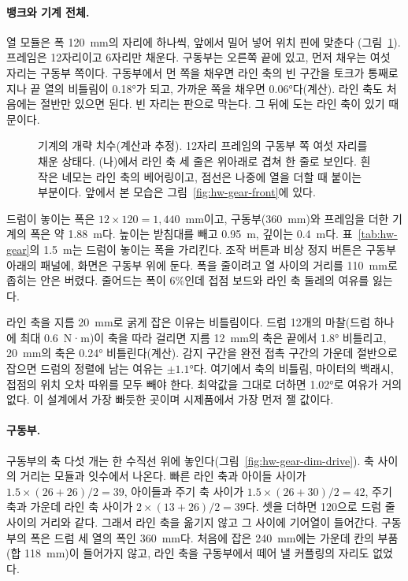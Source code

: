 \paragraph{뱅크와 기계 전체.} 열 모듈은 폭 120~mm의 자리에 하나씩, 앞에서 밀어 넣어 위치 핀에 맞춘다
(그림~\ref{fig:hw-gear-dim-bank}). 프레임은 12자리이고 6자리만 채운다. 구동부는 오른쪽 끝에 있고, 먼저 채우는
여섯 자리는 구동부 쪽이다. 구동부에서 먼 쪽을 채우면 라인 축의 빈 구간을 토크가 통째로 지나 끝 열의
비틀림이 0.18°가 되고, 가까운 쪽을 채우면 0.06°다(계산). 라인 축도 처음에는 절반만 있으면 된다. 빈 자리는
판으로 막는다. 그 뒤에 도는 라인 축이 있기 때문이다.

\begin{figure}[ht]
\centering

\caption{기계의 개략 치수(계산과 추정). 12자리 프레임의 구동부 쪽 여섯 자리를 채운 상태다. (나)에서 라인 축
세 줄은 위아래로 겹쳐 한 줄로 보인다. 흰 작은 네모는 라인 축의 베어링이고, 점선은 나중에 열을 더할 때
붙이는 부분이다. 앞에서 본 모습은 그림~\ref{fig:hw-gear-front}에 있다.}
\label{fig:hw-gear-dim-bank}
\end{figure}

드럼이 놓이는 폭은 $12 \times 120 = 1{,}440$~mm이고, 구동부(360~mm)와 프레임을 더한 기계의 폭은 약 1.88~m다.
높이는 받침대를 빼고 0.95~m, 깊이는 0.4~m다. 표~\ref{tab:hw-gear}의 1.5~m는 드럼이 놓이는 폭을 가리킨다.
조작 버튼과 비상 정지 버튼은 구동부 아래의 패널에, 화면은 구동부 위에 둔다. 폭을 줄이려고 열 사이의
거리를 110~mm로 좁히는 안은 버렸다. 줄어드는 폭이 6\%인데 접점 보드와 라인 축 둘레의 여유를 잃는다.

라인 축을 지름 20~mm로 굵게 잡은 이유는 비틀림이다. 드럼 12개의 마찰(드럼 하나에 최대 0.6~N·m)이 축을 따라
걸리면 지름 12~mm의 축은 끝에서 1.8° 비틀리고, 20~mm의 축은 0.24° 비틀린다(계산). 감지 구간을 완전 접촉
구간의 가운데 절반으로 잡으면 드럼의 정렬에 남는 여유는 $\pm 1.1$°다. 여기에서 축의 비틀림, 마이터의 백래시,
접점의 위치 오차 따위를 모두 빼야 한다. 최악값을 그대로 더하면 1.02°로 여유가 거의 없다. 이 설계에서 가장
빠듯한 곳이며 시제품에서 가장 먼저 잴 값이다.

\paragraph{구동부.} 구동부의 축 다섯 개는 한 수직선 위에 놓인다(그림~\ref{fig:hw-gear-dim-drive}). 축 사이의
거리는 모듈과 잇수에서 나온다. 빠른 라인 축과 아이들 사이가 $1.5 \times (26+26)/2 = 39$, 아이들과 주기 축
사이가 $1.5 \times (26+30)/2 = 42$, 주기 축과 가운데 라인 축 사이가 $2 \times (13+26)/2 = 39$다. 셋을 더하면
120으로 드럼 줄 사이의 거리와 같다. 그래서 라인 축을 옮기지 않고 그 사이에 기어열이 들어간다. 구동부의
폭은 드럼 세 열의 폭인 360~mm다. 처음에 잡은 240~mm에는 가운데 칸의 부품(합 118~mm)이 들어가지 않고,
라인 축을 구동부에서 떼어 낼 커플링의 자리도 없었다.

